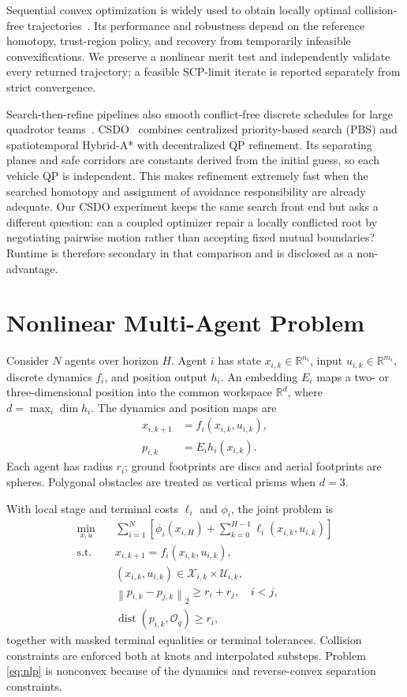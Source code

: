 \documentclass[letterpaper,10pt,conference]{ieeeconf}
\newcommand{\R}{\mathbb{R}}
\newcommand{\norm}[1]{\left\lVert #1\right\rVert}
\begin{document}
Sequential convex optimization is widely used to obtain locally optimal
collision-free trajectories~\cite{Schulman2013TrajOpt,Mao2016SCvx}. Its performance and
robustness depend on the reference homotopy, trust-region policy, and recovery
from temporarily infeasible convexifications. We preserve a nonlinear merit
test and independently validate every returned trajectory; a feasible
SCP-limit iterate is reported separately from strict convergence.

Search-then-refine pipelines also smooth conflict-free discrete schedules for
large quadrotor teams~\cite{Honig2018Swarms}.
CSDO~\cite{Yang2024CSDO} combines centralized priority-based search (PBS) and
spatiotemporal Hybrid-A* with decentralized QP refinement. Its separating
planes and safe corridors are constants derived from the initial guess, so
each vehicle QP is independent. This makes refinement extremely fast when the
searched homotopy and assignment of avoidance responsibility are already
adequate. Our CSDO experiment keeps the same search front end but asks a
different question: can a coupled optimizer repair a locally conflicted root
by negotiating pairwise motion rather than accepting fixed mutual boundaries?
Runtime is therefore secondary in that comparison and is disclosed as a
non-advantage.

\section{Nonlinear Multi-Agent Problem}
\label{sec:problem}
Consider $N$ agents over horizon $H$. Agent $i$ has state
$x_{i,k}\in\R^{n_i}$, input $u_{i,k}\in\R^{m_i}$, discrete dynamics
$f_i$, and position output $h_i$. An embedding $E_i$ maps a two- or
three-dimensional position into the common workspace $\R^d$, where
$d=\max_i\dim h_i$. The dynamics and position maps are
\begin{align}
 x_{i,k+1} &= f_i(x_{i,k},u_{i,k}), \\
 p_{i,k} &= E_i h_i(x_{i,k}).
\end{align}
Each agent has radius $r_i$; ground footprints are discs and aerial footprints
are spheres. Polygonal obstacles are treated as vertical prisms when $d=3$.

With local stage and terminal costs $\ell_i$ and $\phi_i$, the joint problem is
\begin{subequations}\label{eq:nlp}
\begin{align}
 \min_{x,u}\quad & \sum_{i=1}^N\left[
 \phi_i(x_{i,H})+\sum_{k=0}^{H-1}\ell_i(x_{i,k},u_{i,k})\right] \\
 \mathrm{s.t.}\quad
 &x_{i,k+1}=f_i(x_{i,k},u_{i,k}), \\
 &(x_{i,k},u_{i,k})\in\mathcal X_{i,k}\times\mathcal U_{i,k}, \\
 &\norm{p_{i,k}-p_{j,k}}_2\ge r_i+r_j,\quad i<j, \\
 &\operatorname{dist}(p_{i,k},\mathcal O_q)\ge r_i,
\end{align}
\end{subequations}
together with masked terminal equalities or terminal tolerances. Collision
constraints are enforced both at knots and interpolated substeps. Problem
\eqref{eq:nlp} is nonconvex because of the dynamics and reverse-convex
separation constraints.
\end{document}

